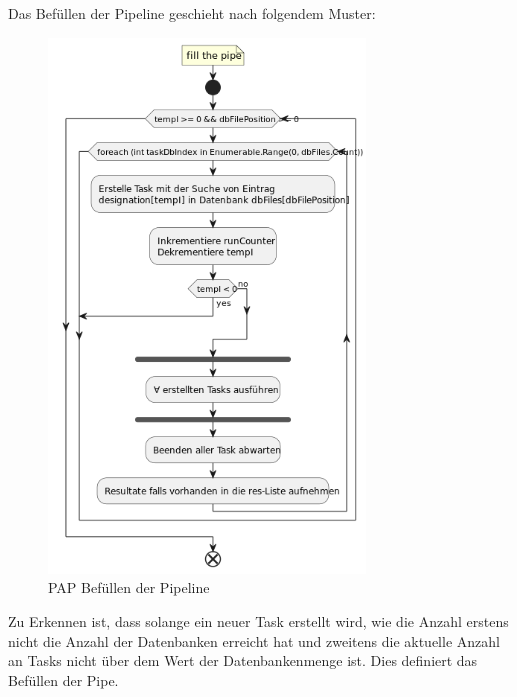     \newpage
    Das Befüllen der Pipeline geschieht nach folgendem Muster:
    \begin{figure}[H]
        \centering
        \includegraphics[width=0.75\textwidth]{../pap/Case_A.png}
        \caption{\ac{PAP} Befüllen der Pipeline}
        \label{png:case_a}
    \end{figure}
    Zu Erkennen ist, dass solange ein neuer Task erstellt wird, wie die Anzahl erstens nicht die Anzahl der Datenbanken erreicht hat und zweitens die aktuelle Anzahl an Tasks nicht über dem Wert der Datenbankenmenge ist.
    Dies definiert das Befüllen der Pipe.

